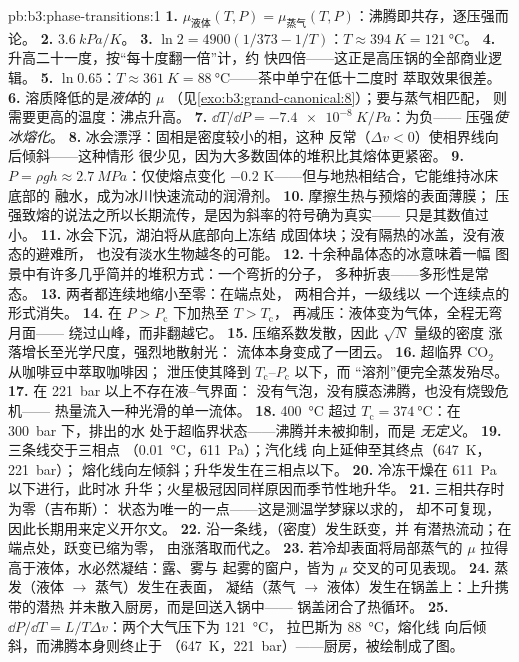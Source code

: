 \begin{solution}{pb:b3:phase-transitions:1}
\textbf{1.} $\mu_{\text{液体}}(T, P) = \mu_{\text{蒸气}}(T,
P)$：沸腾即共存，逐压强而论。
\textbf{2.} $\qty{3.6}{kPa/K}$。
\textbf{3.} $\ln2 = 4900(1/373 - 1/T)$：$T \approx \qty{394}{K} =
\qty{121}{\celsius}$。
\textbf{4.} 升高二十一度，按“每十度翻一倍”计，约
快四倍——这正是高压锅的全部商业逻辑。
\textbf{5.} $\ln0.65$：$T \approx \qty{361}{K} =
\qty{88}{\celsius}$——茶中单宁在低十二度时
萃取效果很差。
\textbf{6.} 溶质降低的是\emph{液体}的 $\mu$
（见\cref{exo:b3:grand-canonical:8}）；要与蒸气相匹配，
则需要更高的温度：沸点升高。
\textbf{7.} $\dd T/\dd P = \qty{-7.4e-8}{K/Pa}$：为负——
压强\emph{使冰熔化}。
\textbf{8.} 冰会漂浮：固相是密度较小的相，这种
反常（$\Delta v < 0$）使相界线向后倾斜——这种情形
很少见，因为大多数固体的堆积比其熔体更紧密。
\textbf{9.} $P = \rho gh \approx \qty{2.7}{MPa}$：仅使熔点变化
$-0.2$ K——但与地热相结合，它能维持冰床底部的
融水，成为冰川快速流动的润滑剂。
\textbf{10.} 摩擦生热与预熔的表面薄膜；
压强致熔的说法之所以长期流传，是因为斜率的符号确为真实——
只是其数值过小。
\textbf{11.} 冰会下沉，湖泊将从底部向上冻结
成固体块；没有隔热的冰盖，没有液态的避难所，
也没有淡水生物越冬的可能。
\textbf{12.} 十余种晶体态的冰意味着一幅
图景中有许多几乎简并的堆积方式：一个弯折的分子，
多种折衷——多形性是常态。
\textbf{13.} 两者都连续地缩小至零：在端点处，
两相合并，一级线以
一个连续点的形式消失。
\textbf{14.} 在 $P > P_{\text{c}}$ 下加热至 $T > T_{\text{c}}$，
再减压：液体变为气体，全程无弯月面——
绕过山峰，而非翻越它。
\textbf{15.} 压缩系数发散，因此 $\sqrt N$ 量级的密度
涨落增长至光学尺度，强烈地散射光：
流体本身变成了一团云。
\textbf{16.} 超临界 CO$_2$ 从咖啡豆中萃取咖啡因；
泄压使其降到 $T_{\text{c}}$--$P_{\text{c}}$ 以下，而
“溶剂”便完全蒸发殆尽。
\textbf{17.} 在 \qty{221}{bar} 以上不存在液–气界面：
没有气泡，没有膜态沸腾，也没有烧毁危机——
热量流入一种光滑的单一流体。
\textbf{18.} \qty{400}{\celsius} 超过 $T_{\text{c}} =
\qty{374}{\celsius}$：在 \qty{300}{bar} 下，排出的水
处于超临界状态——沸腾并未被抑制，而是
\emph{无定义}。
\textbf{19.} 三条线交于三相点
（\qty{0.01}{\celsius}，\qty{611}{Pa}）；汽化线
向上延伸至其终点（\qty{647}{K}，\qty{221}{bar}）；
熔化线向左倾斜；升华发生在三相点以下。
\textbf{20.} 冷冻干燥在 \qty{611}{Pa} 以下进行，此时冰
升华；火星极冠因同样原因而季节性地升华。
\textbf{21.} 三相共存时为零（吉布斯）：
状态为唯一的一点——这是测温学梦寐以求的，
却不可复现，因此长期用来定义开尔文。
\textbf{22.} 沿一条线，（密度）发生跃变，并
有潜热流动；在端点处，跃变已缩为零，
由涨落取而代之。
\textbf{23.} 若冷却表面将局部蒸气的
$\mu$ 拉得高于液体，水必然凝结：露、雾与
起雾的窗户，皆为 $\mu$ 交叉的可见表现。
\textbf{24.} 蒸发（液体 $\to$ 蒸气）发生在表面，
凝结（蒸气 $\to$ 液体）发生在锅盖上：上升携带的潜热
并未散入厨房，而是回送入锅中——
锅盖闭合了热循环。
\textbf{25.} $\dd P/\dd T = L/T\Delta v$：两个大气压下为 \qty{121}{\celsius}，
拉巴斯为 \qty{88}{\celsius}，熔化线
向后倾斜，而沸腾本身则终止于
（\qty{647}{K}，\qty{221}{bar}）——厨房，被绘制成了图。
\end{solution}
